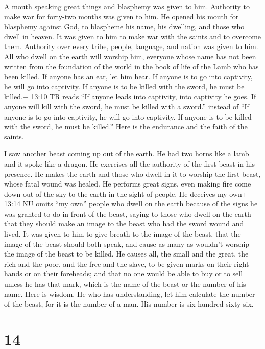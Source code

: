  A mouth speaking great things and blasphemy was given to
him. Authority to make war for forty-two months was given to him.
 He opened his mouth for blasphemy against God, to blaspheme
his name, his dwelling, and those who dwell in heaven.  It
was given to him to make war with the saints and to overcome them.
Authority over every tribe, people, language, and nation was given to
him.  All who dwell on the earth will worship him, everyone
whose name has not been written from the foundation of the world in the
book of life of the Lamb who has been killed.  If anyone has
an ear, let him hear.  If anyone is to go into captivity,
he will go into captivity. If anyone is to be killed with the sword, he
must be killed.+ 13:10 TR reads ``If anyone leads into captivity, into
captivity he goes. If anyone will kill with the sword, he must be killed
with a sword.'' instead of ``If anyone is to go into captivity, he will
go into captivity. If anyone is to be killed with the sword, he must be
killed.'' Here is the endurance and the faith of the saints.

 I saw another beast coming up out of the earth. He had two
horns like a lamb and it spoke like a dragon.  He exercises
all the authority of the first beast in his presence. He makes the earth
and those who dwell in it to worship the first beast, whose fatal wound
was healed.  He performs great signs, even making fire come
down out of the sky to the earth in the sight of people. 
He deceives my own+ 13:14 NU omits ``my own'' people who dwell on the
earth because of the signs he was granted to do in front of the beast,
saying to those who dwell on the earth that they should make an image to
the beast who had the sword wound and lived.  It was given
to him to give breath to the image of the beast, that the image of the
beast should both speak, and cause as many as wouldn't worship the image
of the beast to be killed.  He causes all, the small and
the great, the rich and the poor, and the free and the slave, to be
given marks on their right hands or on their foreheads; 
and that no one would be able to buy or to sell unless he has that mark,
which is the name of the beast or the number of his name. 
Here is wisdom. He who has understanding, let him calculate the number
of the beast, for it is the number of a man. His number is six hundred
sixty-six.

\hypertarget{section-13}{%
\section{14}\label{section-13}}

